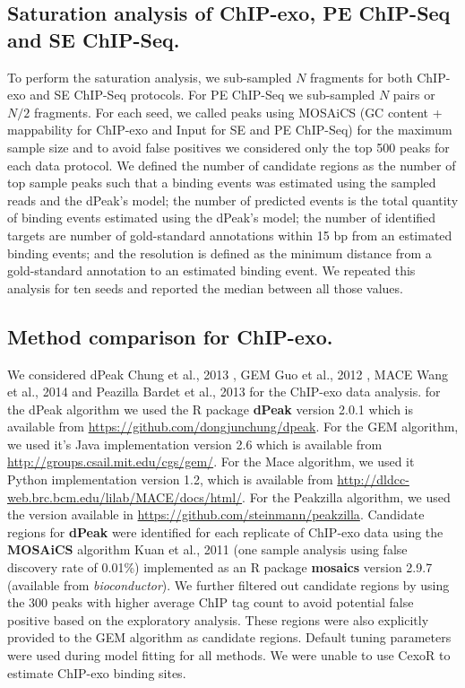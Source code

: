 \documentclass{bmcart}\usepackage[]{graphicx}\usepackage[]{color}
\begin{document}
\subsection*{Saturation analysis of ChIP-exo, PE ChIP-Seq and SE ChIP-Seq.}

To perform the saturation analysis, we sub-sampled $N$ fragments for
both ChIP-exo and SE ChIP-Seq protocols. For PE ChIP-Seq we
sub-sampled $N$ pairs or $N/2$ fragments. For each seed, we called
peaks using MOSAiCS \cite{mosaics} (GC content + mappability for
ChIP-exo and Input for SE and PE ChIP-Seq) for the maximum sample size
and to avoid false positives we considered only the top 500 peaks for
each data protocol. We defined the number of candidate regions as the
number of top sample peaks such that a binding events was estimated
using the sampled reads and the dPeak's model; the number of predicted
events is the total quantity of binding events estimated using the
dPeak's model; the number of identified targets are number of
gold-standard annotations within 15 bp from an estimated binding
events; and the resolution is defined as the minimum distance from a
gold-standard annotation to an estimated binding event. We repeated
this analysis for ten seeds and reported the median between all those
values.

\subsection*{Method comparison for ChIP-exo.}

We considered dPeak Chung et al., 2013 \cite{dpeak}, GEM Guo et al.,
2012 \cite{gem}, MACE Wang et al., 2014 \cite{mace} and Peazilla
Bardet et al., 2013 \cite{peakzilla} for the ChIP-exo data
analysis. for the dPeak algorithm we used the R package \textbf{dPeak}
version 2.0.1 which is available from
\url{https://github.com/dongjunchung/dpeak}. For the GEM algorithm, we
used it's Java implementation version 2.6 which is available from
\url{http://groups.csail.mit.edu/cgs/gem/}. For the Mace algorithm, we
used it Python implementation version 1.2, which is available from
\url{http://dldcc-web.brc.bcm.edu/lilab/MACE/docs/html/}. For the
Peakzilla algorithm, we used the version available in
\url{https://github.com/steinmann/peakzilla}. Candidate regions for
\textbf{dPeak} were identified for each replicate of ChIP-exo data
using the \textbf{MOSAiCS} algorithm Kuan et al., 2011 \cite{mosaics}
(one sample analysis using false discovery rate of 0.01\%)
implemented as an R package \textbf{mosaics} version 2.9.7 (available
from \emph{bioconductor}). We further filtered out candidate regions
by using the 300 peaks with higher average ChIP tag count to
avoid potential false positive based on the exploratory
analysis. These regions were also explicitly provided to the GEM
algorithm as candidate regions. Default tuning parameters were used
during model fitting for all methods. We were unable to use CexoR
\cite{cexor} to estimate ChIP-exo binding sites.
\end{document}

